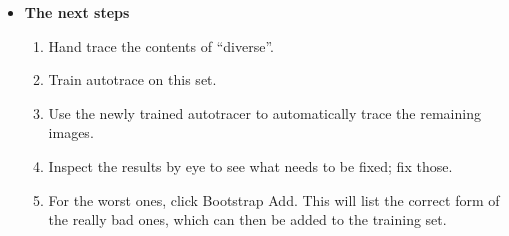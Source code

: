 \documentclass[12pt]{article}
\begin{document}
\begin{itemize}
\item {\bf The next steps}
\begin{enumerate}
	\item Hand trace the contents of ``diverse''.
	\item Train autotrace on this set.
	\item Use the newly trained autotracer to automatically trace the remaining images.
	\item Inspect the results by eye to see what needs to be fixed; fix those.
	\item For the worst ones, click Bootstrap Add. This will list the correct form of the really bad ones, which can then be added to the training set.
\end{enumerate}
\end{itemize}
\end{document}
